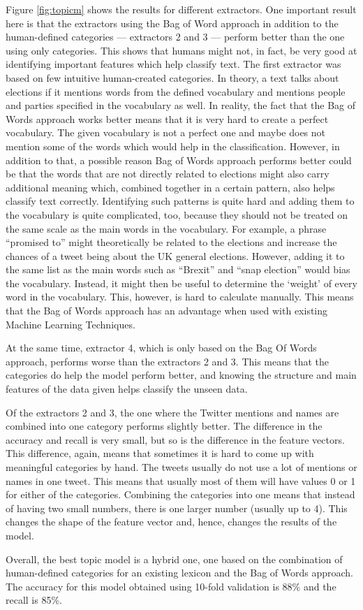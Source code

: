 Figure \ref{fig:topicm} shows the results for different extractors. One important result here is that the extractors using the Bag of Word approach in addition to the human-defined categories --- extractors 2 and 3 ---  perform better than the one using only categories. This shows that humans might not, in fact, be very good at identifying important features which help classify text. The first extractor was based on few intuitive human-created categories. In theory, a text talks about elections if it mentions words from the defined vocabulary and mentions people and parties specified in the vocabulary as well. In reality, the fact that the Bag of Words approach works better means that it is very hard to create a perfect vocabulary. The given vocabulary is not a perfect one and maybe does not mention some of the words which would help in the classification. However, in addition to that, a possible reason Bag of Words approach performs better could be that the words that are not directly related to elections might also carry additional meaning which, combined together in a certain pattern, also helps classify text correctly. Identifying such patterns is quite hard and adding them to the vocabulary is quite complicated, too, because they should not be treated on the same scale as the main words in the vocabulary. For example, a phrase ``promised to'' might theoretically be related to the elections and increase the chances of a tweet being about the UK general elections. However, adding it to the same list as the main words such as ``Brexit'' and ``snap election'' would bias the vocabulary. Instead, it might then be useful to determine the `weight' of every word in the vocabulary. This, however, is hard to calculate manually. This means that the Bag of Words approach has an advantage when used with existing Machine Learning Techniques.

At the same time, extractor 4, which is only based on the Bag Of Words approach, performs worse than the extractors 2 and 3. This means that the categories do help the model perform better, and knowing the structure and main features of the data given helps classify the unseen data.

Of the extractors 2 and 3, the one where the Twitter mentions and names are combined into one category performs slightly better. The difference in the accuracy and recall is very small, but so is the difference in the feature vectors. This difference, again, means that sometimes it is hard to come up with meaningful categories by hand. The tweets usually do not use a lot of mentions or names in one tweet. This means that usually most of them will have values 0 or 1 for either of the categories. Combining the categories into one means that instead of having two small numbers, there is one larger number (usually up to 4). This changes the shape of the feature vector and, hence, changes the results of the model.

Overall, the best topic model is a hybrid one, one based on the combination of human-defined categories for an existing lexicon and the Bag of Words approach. The accuracy for this model obtained using 10-fold validation is 88\% and the recall is 85\%. 
